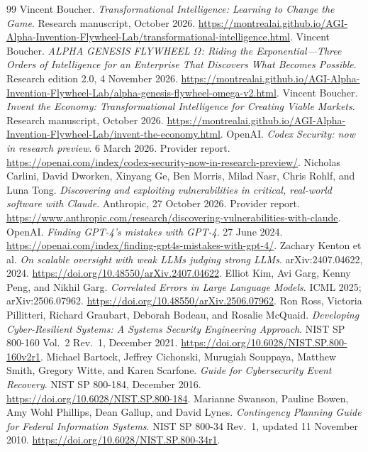 \documentclass[11pt,a4paper]{article}
\newcommand{\chapterpage}{\clearpage}
\begin{document}
\chapterpage
\begingroup
\setlength{\parskip}{2pt}
\begin{thebibliography}{99}
\footnotesize
\setlength{\itemsep}{3pt}
 Vincent Boucher. \emph{Transformational Intelligence: Learning to Change the Game}. Research manuscript, October 2026. \url{https://montrealai.github.io/AGI-Alpha-Invention-Flywheel-Lab/transformational-intelligence.html}.
 Vincent Boucher. \emph{ALPHA GENESIS FLYWHEEL $\Omega$: Riding the Exponential---Three Orders of Intelligence for an Enterprise That Discovers What Becomes Possible}. Research edition 2.0, 4 November 2026. \url{https://montrealai.github.io/AGI-Alpha-Invention-Flywheel-Lab/alpha-genesis-flywheel-omega-v2.html}.
 Vincent Boucher. \emph{Invent the Economy: Transformational Intelligence for Creating Viable Markets}. Research manuscript, October 2026. \url{https://montrealai.github.io/AGI-Alpha-Invention-Flywheel-Lab/invent-the-economy.html}.
 OpenAI. \emph{Codex Security: now in research preview}. 6 March 2026. Provider report. \url{https://openai.com/index/codex-security-now-in-research-preview/}.
 Nicholas Carlini, David Dworken, Xinyang Ge, Ben Morris, Milad Nasr, Chris Rohlf, and Luna Tong. \emph{Discovering and exploiting vulnerabilities in critical, real-world software with Claude}. Anthropic, 27 October 2026. Provider report. \url{https://www.anthropic.com/research/discovering-vulnerabilities-with-claude}.
 OpenAI. \emph{Finding GPT-4's mistakes with GPT-4}. 27 June 2024. \url{https://openai.com/index/finding-gpt4s-mistakes-with-gpt-4/}.
 Zachary Kenton et al. \emph{On scalable oversight with weak LLMs judging strong LLMs}. arXiv:2407.04622, 2024. \url{https://doi.org/10.48550/arXiv.2407.04622}.
 Elliot Kim, Avi Garg, Kenny Peng, and Nikhil Garg. \emph{Correlated Errors in Large Language Models}. ICML 2025; arXiv:2506.07962. \url{https://doi.org/10.48550/arXiv.2506.07962}.
 Ron Ross, Victoria Pillitteri, Richard Graubart, Deborah Bodeau, and Rosalie McQuaid. \emph{Developing Cyber-Resilient Systems: A Systems Security Engineering Approach}. NIST SP 800-160 Vol.~2 Rev.~1, December 2021. \url{https://doi.org/10.6028/NIST.SP.800-160v2r1}.
 Michael Bartock, Jeffrey Cichonski, Murugiah Souppaya, Matthew Smith, Gregory Witte, and Karen Scarfone. \emph{Guide for Cybersecurity Event Recovery}. NIST SP 800-184, December 2016. \url{https://doi.org/10.6028/NIST.SP.800-184}.
 Marianne Swanson, Pauline Bowen, Amy Wohl Phillips, Dean Gallup, and David Lynes. \emph{Contingency Planning Guide for Federal Information Systems}. NIST SP 800-34 Rev.~1, updated 11 November 2010. \url{https://doi.org/10.6028/NIST.SP.800-34r1}.

\end{thebibliography}
\end{document}
